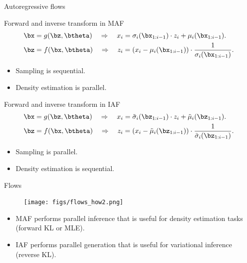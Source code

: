 \begin{frame}{Autoregressive flows}
	\begin{block}{Forward and inverse transform in MAF}
		\vspace{-0.6cm}
		\begin{align*}
			\bx &= g(\bz, \btheta) \quad \Rightarrow \quad x_i = \sigma_i (\bx_{1:i-1}) \cdot z_i + \mu_i(\bx_{1:i-1}). \\
			\bz &= f(\bx, \btheta) \quad \Rightarrow \quad z_i = \left(x_i - \mu_i(\bx_{1:i-1}) \right) \cdot \frac{1}{\sigma_i (\bx_{1:i-1}) }.
		\end{align*}
		\vspace{-0.6cm}
		\begin{itemize}
			\item Sampling is sequential.
			\item Density estimation is parallel.
		\end{itemize}
	\end{block}
	\begin{block}{Forward and inverse transform in IAF}
		\vspace{-0.6cm}
		\begin{align*}
			\bx &= g(\bz, \btheta) \quad \Rightarrow \quad x_i = \tilde{\sigma}_i (\bz_{1:i-1}) \cdot z_i + \tilde{\mu}_i(\bz_{1:i-1}). \\
			\bz &= f(\bx, \btheta) \quad \Rightarrow \quad z_i = \left(x_i - \tilde{\mu}_i(\bz_{1:i-1}) \right) \cdot \frac{1}{\tilde{\sigma}_i (\bz_{1:i-1})}.
		\end{align*}
		\vspace{-0.6cm}
		\begin{itemize}
			\item Sampling is parallel.
			\item Density estimation is sequential.
		\end{itemize}
	\end{block}
\end{frame}
\begin{frame}{Flows}
	\begin{figure}
		\texttt{[image: figs/flows\_how2.png]}
	\end{figure}
	\begin{itemize}	
		\item MAF performs parallel inference that is useful for density estimation tasks (forward KL or MLE).
		\item IAF performs parallel generation that is useful for variational inference (reverse KL).
	\end{itemize}

\end{frame}

